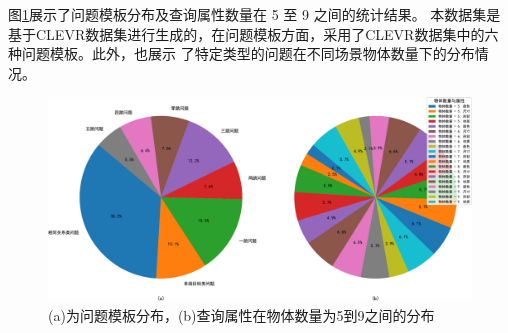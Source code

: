 图\ref{fig:template_statistics}展示了问题模板分布及查询属性数量在 5 至 9 之间的统计结果。
本数据集是基于CLEVR数据集进行生成的，在问题模板方面，采用了CLEVR数据集中的六种问题模板。此外，也展示
了特定类型的问题在不同场景物体数量下的分布情况。
\begin{figure}[h]
    \centering
    \includegraphics[scale=0.45]{figures/question_template_distribution-crop.pdf}
    \caption{(a)为问题模板分布，(b)查询属性在物体数量为5到9之间的分布}
    \label{fig:template_statistics}
\end{figure}
